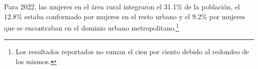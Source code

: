 Para 2022, las mujeres en el área rural integraron el 31.1\% de la población, el 12.8\% estaba conformado por mujeres en el resto urbano y el 9.2\% por mujeres que se encontraban en el dominio urbano metropolitano.\footnote{Los resultados reportados no suman el cien por ciento debido al redondeo de los mismos.}